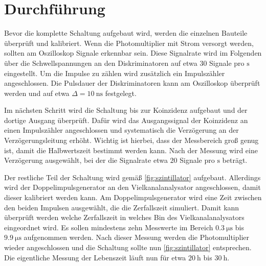 \section{Durchführung}
\label{sec:Durchführung}

Bevor die komplette Schaltung aufgebaut wird, werden die einzelnen Bauteile überprüft und kalibriert.
Wenn die Photomultiplier mit Strom versorgt werden, sollten am Oszilloskop Signale erkennbar sein.
Diese Signalrate wird im Folgenden über die Schwellspannungen an den Diskriminatoren auf etwa $30$ Signale pro $\unit{\second}$ eingestellt.
Um die Impulse zu zählen wird zusätzlich ein Impulszähler angeschlossen.
Die Pulsdauer der Diskriminatoren kann am Oszilloskop überprüft werden und auf etwa $\Delta = \qty{10}{\nano\second}$ festgelegt.

Im nächsten Schritt wird die Schaltung bis zur Koinzidenz aufgebaut und der dortige Ausgang überprüft.
Dafür wird das Ausgangssignal der Koinzidenz an einen Impulszähler angeschlossen und systematisch die Verzögerung an der Verzögerungsleitung erhöht.
Wichtig ist hierbei, dass der Messbereich groß genug ist, damit die Halbwertszeit bestimmt werden kann.
Nach der Messung wird eine Verzögerung ausgewählt, bei der die Signalrate etwa $20$ Signale pro $\unit{\second}$ beträgt.

Der restliche Teil der Schaltung wird gemäß \autoref{fig:szintillator} aufgebaut.
Allerdings wird der Doppelimpulsgenerator an den Vielkanalanalysator angeschlossen, damit dieser kalibriert werden kann.
Am Doppelimpulsgenerator wird eine Zeit zwischen den beiden Impulsen ausgewählt, die die Zerfallszeit simuliert.
Damit kann überprüft werden welche Zerfallszeit in welches Bin des Vielkanalanalysators eingeordnet wird.
Es sollen mindestens zehn Messwerte im Bereich $\qty{0.3}{\micro\second}$ bis $\qty{9.9}{\micro\second}$ aufgenommen werden.
Nach dieser Messung werden die Photomultiplier wieder angeschlossen und die Schaltung sollte nun \autoref{fig:szintillator} entsprechen.
Die eigentliche Messung der Lebenszeit läuft nun für etwa $\qty{20}{\hour}$ bis $\qty{30}{\hour}$.